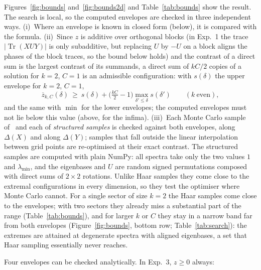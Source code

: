\documentclass[11pt]{article}
\DeclareMathOperator{\Tr}{Tr}
\begin{document}
Figures~\ref{fig:bounds} and~\ref{fig:bounds2d} and Table~\ref{tab:bounds} show the result. The search is local,
so the computed envelopes are checked in three independent ways. (i)~Where an
envelope is known in closed form (below), it is compared with the formula. (ii)~Since $z$ is additive over
orthogonal blocks (in Exp.~1 the trace $|\Tr(XUY)|$ is only subadditive, but replacing $U$ by $-U$ on a block aligns
the phases of the block traces, so the bound below holds) and the contrast of a direct sum is the largest contrast of
its summands, a direct sum of
$kC/2$ copies of a solution for $k=2$, $C=1$ is an admissible configuration: with $s(\delta)$ the upper envelope
for $k=2$, $C=1$,
\[
  \overline z_{k,C}(\delta)\ \ge\ s(\delta)+\bigl(\tfrac{kC}2-1\bigr)\max_{\delta'\le\delta}s(\delta')\qquad(k\ \text{even}),
\]
and the same with $\min$ for the lower envelopes; the computed envelopes must not lie below this value (above, for
the infima). (iii)~Each Monte Carlo sample of~\cite{v1} and each of
 \emph{structured samples} is checked against
both envelopes, along $\Delta(X)$ and along $\Delta(Y)$; samples that fall outside the linear interpolation between
grid points are re-optimised at their exact contrast. The structured samples are computed with plain NumPy: all
spectra take only the two values $1$ and $\lambda_{\min}$, and the eigenbases and $U$ are random signed permutations
composed with direct sums of $2\times2$ rotations. Unlike Haar samples they come close to the extremal
configurations in every dimension, so they test the optimiser where Monte Carlo cannot.
 For a single sector of size $k=2$ the Haar samples come close
to the envelopes; with two sectors they already miss a substantial part of the range (Table~\ref{tab:bounds}), and
for larger $k$ or $C$ they stay in a narrow band far from both envelopes (Figure~\ref{fig:bounds}, bottom row; Table~\ref{tab:search}):
the extremes are attained at degenerate spectra with aligned eigenbases, a set that Haar sampling essentially never
reaches.

Four envelopes can be checked analytically. In Exp.~3, $z\ge0$ always:
\end{document}
